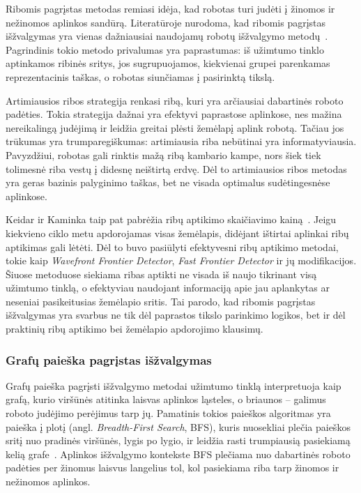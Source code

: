 \documentclass[]{VUMIFTemplateClass}
\begin{document}
Ribomis pagrįstas metodas remiasi idėja, kad robotas turi judėti į žinomos ir nežinomos aplinkos sandūrą. Literatūroje nurodoma, kad ribomis pagrįstas
išžvalgymas yra vienas dažniausiai naudojamų robotų išžvalgymo metodų~\cite{frontier-exploration-2018}. Pagrindinis tokio metodo privalumas yra paprastumas: iš
užimtumo tinklo aptinkamos ribinės sritys, jos sugrupuojamos, kiekvienai grupei parenkamas reprezentacinis taškas, o robotas siunčiamas į pasirinktą tikslą.

Artimiausios ribos strategija renkasi ribą, kuri yra arčiausiai dabartinės roboto padėties. Tokia strategija dažnai yra efektyvi paprastose aplinkose, nes
mažina nereikalingą judėjimą ir leidžia greitai plėsti žemėlapį aplink robotą. Tačiau jos trūkumas yra trumparegiškumas: artimiausia riba nebūtinai yra
informatyviausia. Pavyzdžiui, robotas gali rinktis mažą ribą kambario kampe, nors šiek tiek tolimesnė riba vestų į didesnę neištirtą erdvę. Dėl to artimiausios
ribos metodas yra geras bazinis palyginimo taškas, bet ne visada optimalus sudėtingesnėse aplinkose.

Keidar ir Kaminka taip pat pabrėžia ribų aptikimo skaičiavimo kainą~\cite{keidar2014frontier}. Jeigu kiekvieno ciklo metu apdorojamas visas žemėlapis, didėjant
ištirtai aplinkai ribų aptikimas gali lėtėti. Dėl to buvo pasiūlyti efektyvesni ribų aptikimo metodai, tokie kaip \textit{Wavefront Frontier Detector},
\textit{Fast Frontier Detector} ir jų modifikacijos. Šiuose metoduose siekiama ribas aptikti ne visada iš naujo tikrinant visą užimtumo tinklą, o efektyviau
naudojant informaciją apie jau aplankytas ar neseniai pasikeitusias žemėlapio sritis. Tai parodo, kad ribomis pagrįstas išžvalgymas yra svarbus ne tik dėl
paprastos tikslo parinkimo logikos, bet ir dėl praktinių ribų aptikimo bei žemėlapio apdorojimo klausimų.

\subsubsection{Grafų paieška pagrįstas išžvalgymas}                                                                                                            
                  
Grafų paieška pagrįsti išžvalgymo metodai užimtumo tinklą interpretuoja kaip grafą, kurio viršūnės atitinka laisvas aplinkos ląsteles, o briaunos -- galimus   
roboto judėjimo perėjimus tarp jų. Pamatinis tokios paieškos algoritmas yra paieška į plotį (angl. \textit{Breadth-First Search}, BFS), kuris nuosekliai plečia
paieškos sritį nuo pradinės viršūnės, lygis po lygio, ir leidžia rasti trumpiausią pasiekiamą kelią grafe~\cite{Introduction-to-Algorithms-book}.                                                                                                                  
Aplinkos išžvalgymo kontekste BFS plečiama nuo dabartinės roboto padėties per žinomus laisvus langelius tol, kol pasiekiama riba tarp žinomos ir nežinomos     
aplinkos.                                                                                                                                                      
                
\end{document}
